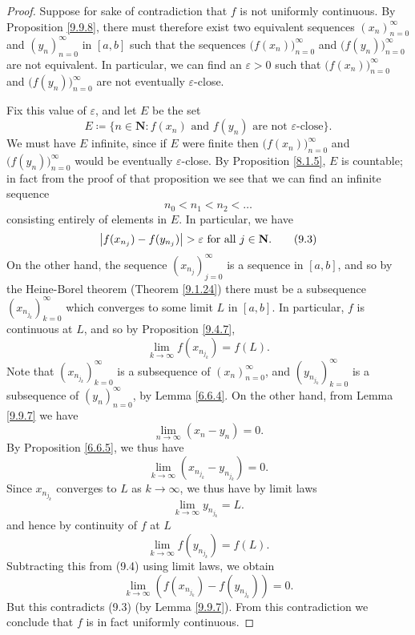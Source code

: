 \begin{proof}
    Suppose for sake of contradiction that \(f\) is not uniformly continuous.
    By Proposition \ref{9.9.8}, there must therefore exist two equivalent sequences \((x_n)_{n = 0}^\infty\) and \((y_n)_{n = 0}^\infty\) in \([a, b]\) such that the sequences \(\big(f(x_n)\big)_{n = 0}^\infty\) and \(\big(f(y_n)\big)_{n = 0}^\infty\) are not equivalent.
    In particular, we can find an \(\varepsilon > 0\) such that \(\big(f(x_n)\big)_{n = 0}^\infty\) and \(\big(f(y_n)\big)_{n = 0}^\infty\) are not eventually \(\varepsilon\)-close.

    Fix this value of \(\varepsilon\), and let \(E\) be the set
    \[
        E \coloneqq \{n \in \mathbf{N} : f(x_n) \text{ and } f(y_n) \text{ are not \(\varepsilon\)-close}\}.
    \]
    We must have \(E\) infinite, since if \(E\) were finite then \(\big(f(x_n)\big)_{n = 0}^\infty\) and \(\big(f(y_n)\big)_{n = 0}^\infty\) would be eventually \(\varepsilon\)-close.
    By Proposition \ref{8.1.5}, \(E\) is countable;
    in fact from the proof of that proposition we see that we can find an infinite sequence
    \[
        n_0 < n_1 < n_2 < \dots
    \]
    consisting entirely of elements in \(E\).
    In particular, we have
    \[
        \abs*{f(x_{n_j}) - f(y_{n_j})} > \varepsilon \text{ for all } j \in \mathbf{N}. \tag{9.3}\label{eq 9.3}
    \]
    On the other hand, the sequence \((x_{n_j})_{j = 0}^\infty\) is a sequence in \([a, b]\), and so by the Heine-Borel theorem (Theorem \ref{9.1.24}) there must be a subsequence \((x_{n_{j_k}})_{k = 0}^\infty\) which converges to some limit \(L\) in \([a, b]\).
    In particular, \(f\) is continuous at \(L\), and so by Proposition \ref{9.4.7},
    \[
        \lim_{k \to \infty} f(x_{n_{j_k}}) = f(L). \tag{9.4}\label{eq 9.4}
    \]
    Note that \((x_{n_{j_k}})_{k = 0}^\infty\) is a subsequence of \((x_n)_{n = 0}^\infty\), and \((y_{n_{j_k}})_{k = 0}^\infty\) is a subsequence of \((y_n)_{n = 0}^\infty\), by Lemma \ref{6.6.4}.
    On the other hand, from Lemma \ref{9.9.7} we have
    \[
        \lim_{n \to \infty} (x_n - y_n) = 0.
    \]
    By Proposition \ref{6.6.5}, we thus have
    \[
        \lim_{k \to \infty} (x_{n_{j_k}} - y_{n_{j_k}}) = 0.
    \]
    Since \(x_{n_{j_k}}\) converges to \(L\) as \(k \to \infty\), we thus have by limit laws
    \[
        \lim_{k \to \infty} y_{n_{j_k}} = L.
    \]
    and hence by continuity of \(f\) at \(L\)
    \[
        \lim_{k \to \infty} f(y_{n_{j_k}}) = f(L).
    \]
    Subtracting this from (9.4) using limit laws, we obtain
    \[
        \lim_{k \to \infty} (f(x_{n_{j_k}}) - f(y_{n_{j_k}})) = 0.
    \]
    But this contradicts (9.3) (by Lemma \ref{9.9.7}).
    From this contradiction we conclude that \(f\) is in fact uniformly continuous.
\end{proof}

